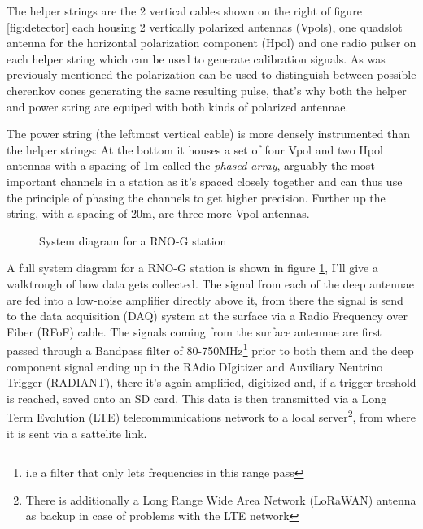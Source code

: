 \documentclass[11pt,a4paper,faculty=we,language=en,doctype=report]{cls/ugent-doc}
\begin{document}
The helper strings are the 2 vertical cables shown on the right of figure
\ref{fig:detector} each housing 2 vertically polarized antennas (Vpols), one
quadslot antenna for the horizontal polarization component (Hpol) and one radio
pulser on each helper string which can be used to generate calibration signals.
As was previously mentioned the polarization can be used to
distinguish between possible cherenkov cones generating the same resulting
pulse, that's why both the helper and power string are equiped with both kinds
of polarized antennae.

The power string (the leftmost vertical cable) is more densely instrumented
than the helper strings: At the bottom it houses a set of four Vpol and two
Hpol antennas with a spacing of 1m called the \textit{phased array}, arguably
the most important channels in a station as it's spaced closely together and
can thus use the principle of phasing the channels to get higher precision.
Further up the string, with a spacing of 20m, are three more Vpol antennas.
\begin{figure}
  \centering
  \caption{System diagram for a RNO-G station}
  \label{fig:SysDiag}
\end{figure}

A full system diagram for a RNO-G station is shown in figure \ref{fig:SysDiag}, I'll
give a walktrough of how data gets collected.
The signal from each of the deep antennae are fed into a low-noise amplifier
directly above it, from there the signal is send to the data acquisition (DAQ)
system at the surface via a Radio Frequency over Fiber (RFoF) cable.  The
signals coming from the surface antennae are first passed through a Bandpass
filter of 80-750MHz\footnote{i.e a filter that only lets frequencies in this
range pass} prior to both them and the deep component signal ending up in the
RAdio DIgitizer and Auxiliary Neutrino Trigger (RADIANT), there it's again
amplified, digitized and, if a trigger treshold is reached, saved onto an SD
card. This data is then transmitted via a Long Term Evolution (LTE)
telecommunications network to a local server\footnote{There is additionally a
Long Range Wide Area Network (LoRaWAN) antenna as backup in case of problems
with the LTE network}, from where it is sent via a sattelite link.
\end{document}
